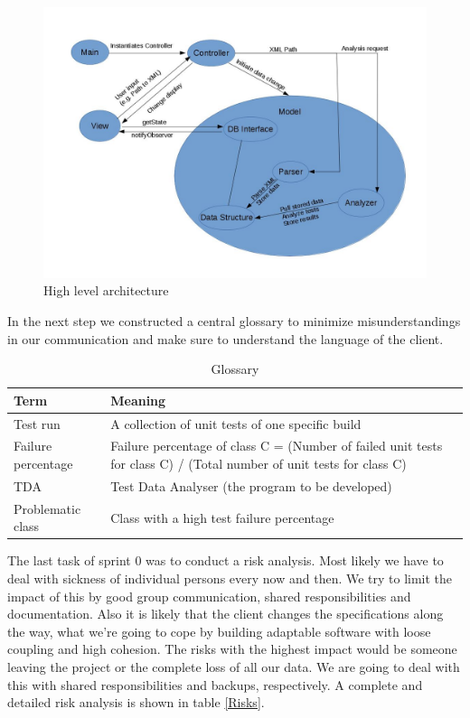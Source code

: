 \newpage

\begin{figure}[h]
\begin{center}
\includegraphics[scale=0.3]{pics/Architecture_diagram.jpg}
\caption{High level architecture} 
\label{HLA}
\end{center}
\end{figure}

In the next step we constructed a central glossary to minimize misunderstandings in our communication and make sure to understand the language of the client. \\ 

\begin{table}[h]
  \caption{Glossary}
  \label{Glossary}
  \centering
  \begin{tabular}{p{2.3cm}||p{10cm}|}
  	Term & Meaning \\ 
  	\hline
  	\hline
  	Test run & A collection of unit tests of one specific build \\ 
  	\hline
  	Failure percentage & Failure percentage of class C = (Number of failed unit tests for class C) / (Total number of unit tests for class C) \\ 
  	\hline
  	TDA & Test Data Analyser (the program to be developed) \\ 
  	\hline
  	Problematic class & Class with a high test failure percentage \\ 
  	\hline
  \end{tabular}
\end{table}

The last task of sprint 0 was to conduct a risk analysis. Most likely we have to deal with sickness of individual persons every now and then. We try to limit the impact of this by good group communication, shared responsibilities and documentation. Also it is likely that the client changes the specifications along the way, what we’re going to cope by building adaptable software with loose coupling and high cohesion. The risks with the highest impact would be someone leaving the project or the complete loss of all our data. We are going to deal with this with shared responsibilities and backups, respectively. A complete and detailed risk analysis is shown in table \ref{Risks}. \\ 

